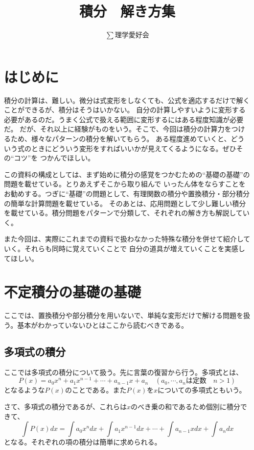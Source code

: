 \documentclass[a4j,dvipdfmx]{jsarticle}
\title{積分　解き方集}
\author{$\sum$理学愛好会}
\date{}
\begin{document}
\maketitle
\section{はじめに}
積分の計算は、難しい。微分は式変形をしなくても、公式を適応するだけで解くことができるが、積分はそうはいかない。
自分の計算しやすいように変形する必要があるのだ。うまく公式で扱える範囲に変形するにはある程度知識が必要だ。
だが、それ以上に経験がものをいう。そこで、今回は積分の計算力をつけるため、様々なパターンの積分を解いてもらう。
ある程度進めていくと、どういう式のときにどういう変形をすればいいかが見えてくるようになる。ぜひその``コツ''を
つかんでほしい。

この資料の構成としては、まず始めに積分の感覚をつかむための``基礎の基礎''の問題を載せている。とりあえずそこから取り組んで
いったん体をならすことをお勧めする。つぎに``基礎''の問題として、有理関数の積分や置換積分・部分積分の簡単な計算問題を載せている。
そのあとは、応用問題として少し難しい積分を載せている。積分問題をパターンで分類して、それぞれの解き方も解説していく。

また今回は、実際にこれまでの資料で扱わなかった特殊な積分を併せて紹介していく。それらも同時に覚えていくことで
自分の道具が増えていくことを実感してほしい。


\newpage
\tableofcontents
\clearpage

\section{不定積分の基礎の基礎}
ここでは、置換積分や部分積分を用いないで、単純な変形だけで解ける問題を扱う。基本がわかっていないひとはここから読むべきである。
\subsection{多項式の積分}
ここでは多項式の積分について扱う。先に言葉の復習から行う。多項式とは、
\begin{equation*}
    P(x)=a_0 x^n +a_1 x^{n-1} +\cdots+a_{n-1}x+a_n\quad(\text{$a_0,\cdots,a_n$は定数　$n>1$})
\end{equation*}
となるような$P(x)$のことである。また$P(x)$を$x$についての多項式ともいう。

さて、多項式の積分であるが、これらは$x$のべき乗の和であるため個別に積分できて、
\begin{equation*}
    \int P(x)dx=\int a_0x^ndx +\int a_1 x^{n-1}dx+\cdots+\int a_{n-1}xdx+\int a_ndx
\end{equation*}
となる。それぞれの項の積分は簡単に求められる。
\end{document}
